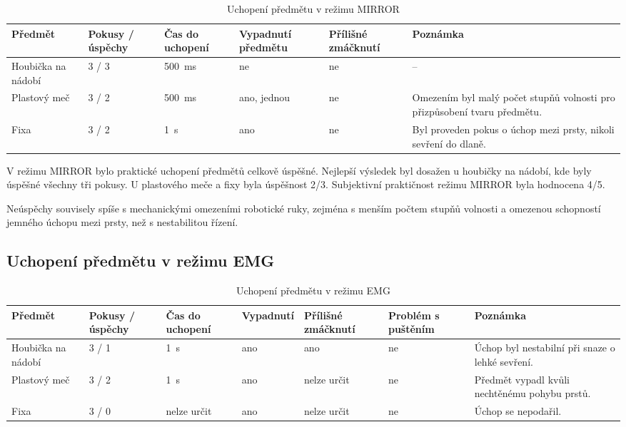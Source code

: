 \begin{table}[H]
\centering
\caption{Uchopení předmětu v režimu MIRROR}
\label{tab:mirror-uchopeni}
\setlength{\tabcolsep}{2pt}
\begin{tabular}{|p{}|p{}|p{}|p{}|p{}|p{}|}
\hline
\textbf{Předmět} & \textbf{Pokusy / úspěchy} & \textbf{Čas do uchopení} & \textbf{Vypadnutí předmětu} & \textbf{Přílišné zmáčknutí} & \textbf{Poznámka} \\
\hline
Houbička na nádobí & 3 / 3 & 500~ms & ne & ne & -- \\
\hline
Plastový meč & 3 / 2 & 500~ms & ano, jednou & ne & Omezením byl malý počet stupňů volnosti pro přizpůsobení tvaru předmětu. \\
\hline
Fixa & 3 / 2 & 1~s & ano & ne & Byl proveden pokus o úchop mezi prsty, nikoli sevření do dlaně. \\
\hline
\end{tabular}
\end{table}

V režimu MIRROR bylo praktické uchopení předmětů celkově úspěšné. Nejlepší výsledek byl dosažen u houbičky na nádobí, kde byly úspěšné všechny tři pokusy. U plastového meče a fixy byla úspěšnost 2/3. Subjektivní praktičnost režimu MIRROR byla hodnocena 4/5.

Neúspěchy souvisely spíše s mechanickými omezeními robotické ruky, zejména s menším počtem stupňů volnosti a omezenou schopností jemného úchopu mezi prsty, než s nestabilitou řízení.

\subsection{Uchopení předmětu v režimu EMG}
\label{subsec:uchopeni-emg}

\begin{table}[H]
\centering
\caption{Uchopení předmětu v režimu EMG}
\label{tab:emg-uchopeni}
\setlength{\tabcolsep}{2pt}
\begin{tabular}{|p{}|p{}|p{}|p{}|p{}|p{}|p{}|}
\hline
\textbf{Předmět} & \textbf{Pokusy / úspěchy} & \textbf{Čas do uchopení} & \textbf{Vypadnutí} & \textbf{Přílišné zmáčknutí} & \textbf{Problém s puštěním} & \textbf{Poznámka} \\
\hline
Houbička na nádobí & 3 / 1 & 1~s & ano & ano & ne & Úchop byl nestabilní při snaze o lehké sevření. \\
\hline
Plastový meč & 3 / 2 & 1~s & ano & nelze určit & ne & Předmět vypadl kvůli nechtěnému pohybu prstů. \\
\hline
Fixa & 3 / 0 & nelze určit & ano & nelze určit & ne & Úchop se nepodařil. \\
\hline
\end{tabular}
\end{table}

